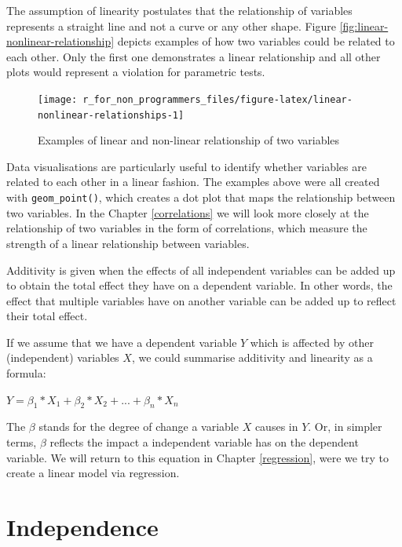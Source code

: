 \documentclass[
]{book}
\begin{document}
The assumption of linearity postulates that the relationship of variables represents a straight line and not a curve or any other shape. Figure \ref{fig:linear-nonlinear-relationship} depicts examples of how two variables could be related to each other. Only the first one demonstrates a linear relationship and all other plots would represent a violation for parametric tests.

\begin{figure}

{\centering \texttt{[image: r\_for\_non\_programmers\_files/figure-latex/linear-nonlinear-relationships-1]} 

}

\caption{Examples of linear and non-linear relationship of two variables}\label{fig:linear-nonlinear-relationships}
\end{figure}

Data visualisations are particularly useful to identify whether variables are related to each other in a linear fashion. The examples above were all created with \texttt{geom\_point()}, which creates a dot plot that maps the relationship between two variables. In the Chapter \ref{correlations} we will look more closely at the relationship of two variables in the form of correlations, which measure the strength of a linear relationship between variables.

Additivity is given when the effects of all independent variables can be added up to obtain the total effect they have on a dependent variable. In other words, the effect that multiple variables have on another variable can be added up to reflect their total effect.

If we assume that we have a dependent variable \(Y\) which is affected by other (independent) variables \(X\), we could summarise additivity and linearity as a formula:

\leavevmode\hypertarget{linearity_additivity-formula}{}%
\(Y = \beta_{1} * X_1 + \beta_{2} * X_{2} + ... + \beta_{n} * X_{n}\)

The \(\beta\) stands for the degree of change a variable \(X\) causes in \(Y\). Or, in simpler terms, \(\beta\) reflects the impact a independent variable has on the dependent variable. We will return to this equation in Chapter \ref{regression}, were we try to create a linear model via regression.

\hypertarget{independence}{%
\section{Independence}\label{independence}}
\end{document}
